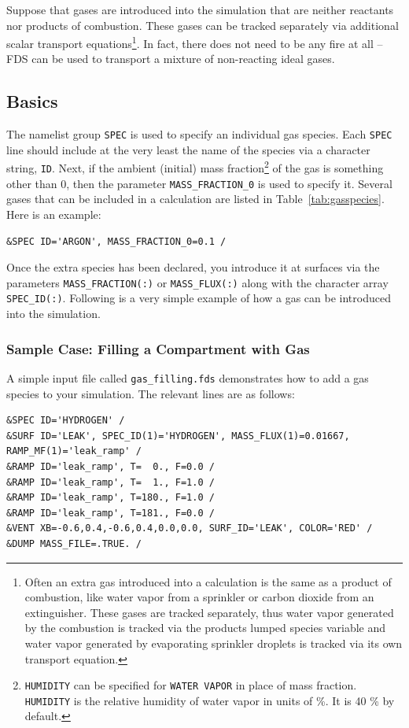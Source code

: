 \documentclass[11pt]{book}
\newcommand{\ct}{\tt\small}
\begin{document}
Suppose that gases are introduced into the simulation that are neither reactants nor products of combustion. These gases can be tracked separately via additional scalar transport equations\footnote{Often an extra gas introduced into a calculation is the same as a product of combustion, like water vapor from a sprinkler or carbon dioxide from an extinguisher. These gases are tracked separately, thus water vapor generated by the combustion is tracked via the products lumped species variable and water vapor generated by evaporating sprinkler droplets is tracked via its own transport equation.}. In fact, there does not need to be any fire at all -- FDS can be used to transport a mixture of non-reacting ideal gases.

\subsection{Basics}

\label{info:SPEC_Basics}

The namelist group {\ct SPEC} is used to specify an individual gas species. Each {\ct SPEC} line should include at the very least
the name of the species via a character string, {\ct ID}. Next, if the ambient (initial) mass fraction\footnote{{\ct HUMIDITY} can be specified for {\ct WATER VAPOR} in place of mass fraction. {\ct HUMIDITY} is the relative humidity of water vapor in units of \%. It is 40 \% by default.} of the gas is something other than 0, then the parameter {\ct MASS\_FRACTION\_0} is used to specify it. Several gases that can be included in a calculation are listed in Table~\ref{tab:gasspecies}. Here is an example:

\footnotesize
\begin{verbatim}
&SPEC ID='ARGON', MASS_FRACTION_0=0.1 /
\end{verbatim}
\normalsize

\noindent
Once the extra species has been declared, you introduce it at surfaces via the
parameters {\ct MASS\_FRACTION(:)} or {\ct MASS\_FLUX(:)} along with the character array {\ct SPEC\_ID(:)}.
Following is a very simple example of how a gas can be introduced into the simulation.


\subsubsection{Sample Case: Filling a Compartment with Gas}

A simple input file called {\ct gas\_filling.fds} demonstrates how to add a gas species to your simulation. The relevant lines are as follows:
\footnotesize
\begin{verbatim}
&SPEC ID='HYDROGEN' /
&SURF ID='LEAK', SPEC_ID(1)='HYDROGEN', MASS_FLUX(1)=0.01667, RAMP_MF(1)='leak_ramp' /
&RAMP ID='leak_ramp', T=  0., F=0.0 /
&RAMP ID='leak_ramp', T=  1., F=1.0 /
&RAMP ID='leak_ramp', T=180., F=1.0 /
&RAMP ID='leak_ramp', T=181., F=0.0 /
&VENT XB=-0.6,0.4,-0.6,0.4,0.0,0.0, SURF_ID='LEAK', COLOR='RED' /
&DUMP MASS_FILE=.TRUE. /
\end{verbatim}
\normalsize
\end{document}

